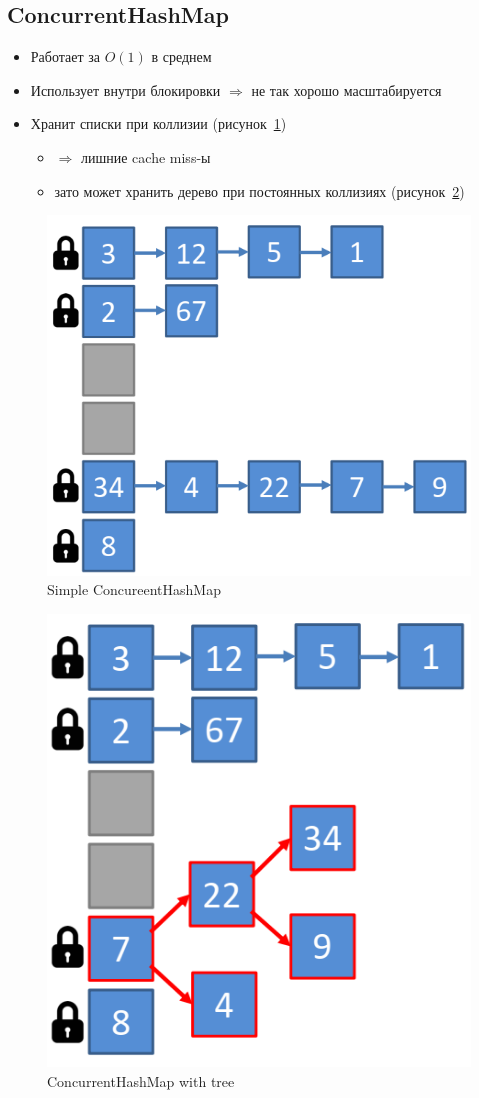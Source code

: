 \documentclass[10pt,a4paper,oneside,titlepage]{article}
\theoremstyle{plain}
\theoremstyle{defenition}
\begin{document}
\subsection{ConcurrentHashMap}

\begin{itemize}
	\item Работает за $O(1)$ в среднем
	\item Использует внутри блокировки $\Rightarrow$ не так хорошо масштабируется
	\item Хранит списки при коллизии (рисунок~\ref{fig:concurrenthashmap1})
	\begin{itemize}
		\item $\Rightarrow$ лишние cache miss-ы
		\item зато может хранить дерево при постоянных коллизиях (рисунок~\ref{fig:concurrenthashmap2})
	\end{itemize}
\end{itemize}

\begin{figure}[h!]
	\centering
	\includegraphics[width=0.4\linewidth]{pictures/ConcurrentHashMap1}
	\caption{Simple ConcureentHashMap}
	\label{fig:concurrenthashmap1}
\end{figure}

\begin{figure}[h!]
	\centering
	\includegraphics[width=0.4\linewidth]{pictures/ConcurrentHashMap2}
	\caption{ConcurrentHashMap with tree}
	\label{fig:concurrenthashmap2}
\end{figure}
\end{document}
